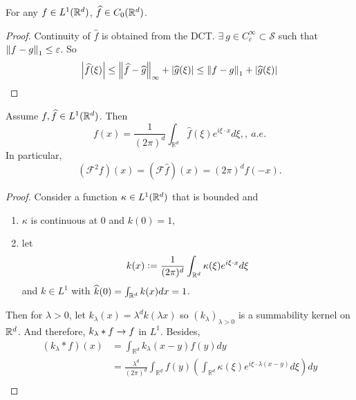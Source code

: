 \begin{enumerate}[label=\arabic*.]
	\begin{prop}
		For any $f \in L^1(\mathbb{R}^d)$, $\widehat{f} \in C_0(\mathbb{R}^d)$.
	\end{prop}
	\begin{proof}
		Continuity of $\widehat{f}$ is obtained from the DCT. $\exists~g \in C_c^\infty \subset \mathcal{S}$ such that $\left\lVert f - g\right\lVert_1 \leq \varepsilon$. So
		\begin{equation*}
			\left\lvert\widehat{f}(\xi)\right\lvert \leq \left\lVert\widehat{f} - \widehat{g}\right\lVert_\infty + \left\lvert\widehat{g}(\xi)\right\lvert \leq \left\lVert f-g\right\lVert_1 + \left\lvert\widehat{g}(\xi)\right\lvert
		\end{equation*}
	\end{proof}

	\begin{thm}
		Assume $f,\widehat{f} \in L^1(\mathbb{R}^d)$. Then
		\begin{equation*}
			f(x)=\frac{1}{(2 \pi)^d} \int_{\mathbb{R}^d} \widehat{f}(\xi) e^{i \xi \cdot x} d \xi,,~a.e.
		\end{equation*}
		In particular,
		\begin{equation*}
			\left(\mathcal{F}^2 f\right)(x)=(\mathcal{F} \widehat{f})(x)=(2 \pi)^d f(-x) .
		\end{equation*}
	\end{thm}
	\begin{proof}
		Consider a function $\kappa \in L^1(\mathbb{R}^d)$ that is bounded and
		\begin{enumerate}[label=(\arabic{*})]
			\item $\kappa$ is continuous at $0$ and $k(0) = 1$,
			\item let 
			\begin{equation*}
				k(x) \vcentcolon= \frac{1}{(2\pi)^d}\int_{\mathbb{R}^d}\kappa(\xi)e^{i\xi \cdot x}d\xi
			\end{equation*}
			and $k \in L^1$ with $\widehat{k}(0) = \int_{\mathbb{R}^d}k(x)dx = 1$.
		\end{enumerate}
		Then for $\lambda > 0$, let $k_\lambda(x) = \lambda^dk(\lambda x)$ so $(k_\lambda)_{\lambda > 0}$ is a summability kernel on $\mathbb{R}^d$. And therefore, $k_\lambda * f \rightarrow f$ in $L^1$. Besides,
		\begin{equation*}
			\begin{aligned}
				\left(k_\lambda * f\right)(x) & =\int_{\mathbb{R}^d} k_\lambda(x-y) f(y) d y \\
				& =\frac{\lambda^d}{(2 \pi)^d} \int_{\mathbb{R}^d} f(y)\left(\int_{\mathbb{R}^d} \kappa(\xi) e^{i \xi \cdot \lambda(x-y)} d \xi\right) d y \\

\end{aligned}
\end{equation*}
\end{proof}
\end{enumerate}

